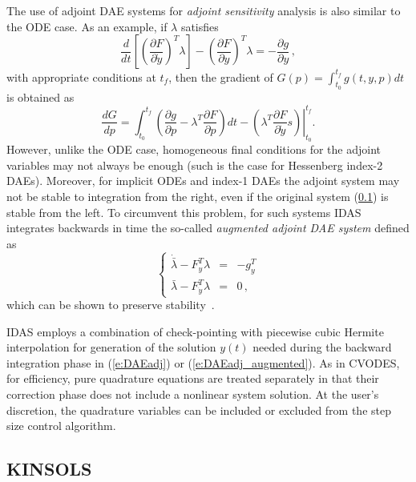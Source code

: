The use of adjoint DAE systems for {\em adjoint sensitivity} analysis is also
similar to the ODE case. As an example, if $\lambda$ satisfies 
\begin{equation}\label{e:DAEadj} 
  \frac{d}{dt} \left[ \left( \frac{\partial F}{\partial \dot{y}}\right) ^T \lambda \right] 
  - \left(\frac{\partial F}{\partial y}\right)^T \lambda = - \frac{\partial g}{\partial y} \, ,
\end{equation}
with appropriate conditions at $t_f$, then the gradient of 
$G(p) = \int_{t_0}^{t_f} g(t,y,p) dt$ is obtained as
\begin{equation*}
  \frac{dG}{dp} = 
  \int_{t_0}^{t_f} \left(
    \frac{\partial g}{\partial p} - \lambda^T \frac{\partial F}{\partial p}
  \right) dt 
  - \left.\left( 
      \lambda^T \frac{\partial F}{\partial \dot{y}} s 
    \right)\right|_{t_0}^{t_f} . 
\end{equation*}
However, unlike the ODE case, homogeneous final conditions for the 
adjoint variables may not always be enough (such is the case for 
Hessenberg index-2 DAEs).
%
Moreover, for implicit ODEs and index-1 DAEs the adjoint system may not
be stable to integration from the right, even if the original system (\ref{}) 
is stable from the left. To circumvent this problem, for such
systems IDAS integrates backwards in time the so-called 
{\em augmented adjoint DAE system} defined as
\begin{equation} \label{e:DAEadj_augmented}
\left \{
\begin{array}{rcl}
\dot {\bar\lambda} - F_y^T \lambda & = &  -g_y^T \\
\bar \lambda - F_{\dot y}^T \lambda & = & 0 \, ,
\end{array}
\right.
\end{equation}
which can be shown to preserve stability~\cite{CLPS:03}.

IDAS employs a combination of check-pointing with piecewise cubic Hermite 
interpolation for generation of the solution $y(t)$ needed during the
backward integration phase in (\ref{e:DAEadj}) or (\ref{e:DAEadj_augmented}).
As in CVODES, for efficiency, pure quadrature equations are treated separately
in that their correction phase does not include a nonlinear system solution.
At the user's discretion, the quadrature variables can be included or excluded
from the step size control algorithm.
 

\subsection{KINSOLS}

